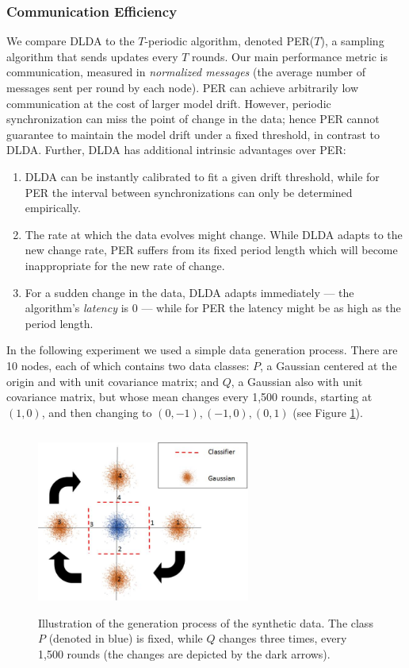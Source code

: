 \subsubsection{Communication Efficiency}\label{sec:com_eff}
We compare DLDA to the $T$-periodic algorithm, denoted
PER($T$), a sampling algorithm that sends updates
every $T$ rounds.
Our main performance metric is communication, measured in \textit{normalized messages} (the average number of messages sent per round by each node). 
PER can achieve arbitrarily low communication at the cost of larger model drift. However,
periodic synchronization can miss the point of change in the data; 
hence PER cannot guarantee to maintain the model drift under a fixed threshold, in contrast to DLDA.  Further,
DLDA has additional intrinsic advantages over PER: 
\begin{enumerate}
\item DLDA can be instantly calibrated to fit a given drift threshold, while for PER the 
interval between synchronizations can only be determined empirically. 
\item The rate at which the data evolves might change. 
While DLDA adapts to the new change rate, PER suffers from its fixed period length
which will become inappropriate for the new rate of change.
\item For a sudden change in the data, DLDA adapts immediately --- the algorithm's
\textit{latency} is 0 --- while for PER the latency might be as high as the period length.
\end{enumerate}
%
In the following experiment we used a simple data generation process. There are 
10 nodes, each of which contains two data classes: $P$, a Gaussian centered
at the origin and with unit covariance matrix; and $Q$, a Gaussian also
with unit covariance matrix, but whose mean changes every 1,500 rounds, starting 
at $(1,0)$, and then changing to $(0,-1), (-1,0), (0,1)$ (see 
Figure \ref{fig:synth-data}).

\begin{figure}
	\centering
	\includegraphics[width=7cm, height=6cm]{graphics/DataShiftInEarlyDetection.jpg}
	\caption{
	\label{fig:synth-data}
	Illustration of the generation process of the synthetic data.
	The class $P$ (denoted in blue) is fixed, while $Q$ changes three
	times, every 1,500 rounds (the changes are depicted by the dark arrows).}
\end{figure}

